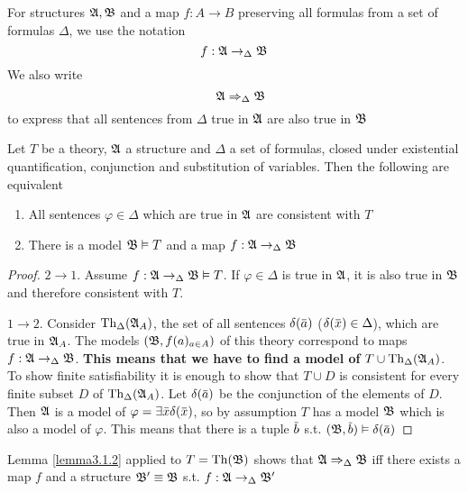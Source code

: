 \documentclass[11pt]{article}
\begin{document}
For structures \(\mathfrak{A},\mathfrak{B}\) and a map \(f:A\to B\) preserving all formulas
from a set of formulas \(\Delta\), we use the notation
\begin{equation*}
f:\mathfrak{A}\to_\Delta\mathfrak{B}
\end{equation*}
We also write
\begin{equation*}
\quad\mathfrak{A}\Rightarrow_\Delta\mathfrak{B}
\end{equation*}
to express that all sentences from \(\Delta\) true in \(\mathfrak{A}\) are also true in \(\mathfrak{B}\)

\begin{lemma}[]
\label{lemma3.1.2}
Let \(T\) be a theory, \(\mathfrak{A}\) a structure and \(\Delta\) a set of formulas, closed
under existential quantification, conjunction and substitution of variables.
Then the following are equivalent
\begin{enumerate}
\item All sentences \(\varphi\in\Delta\) which are true in \(\mathfrak{A}\) are
consistent with \(T\)
\item There is a model \(\mathfrak{B}\vDash T\) and a map \(f:\mathfrak{A}\to_\Delta\mathfrak{B}\)
\end{enumerate}
\end{lemma}

\begin{proof}
\(2\to 1\). Assume \(f:\mathfrak{A}\to_\Delta\mathfrak{B}\vDash T\). If \(\varphi\in\Delta\) is true in \(\mathfrak{A}\), it is also true in \(\mathfrak{B}\) and
therefore consistent with \(T\).

\(1\to2\). Consider \(\operatorname{Th}_\Delta(\mathfrak{A}_A)\), the set of all sentences \(\delta(\bbar{a})\)
(\(\delta(\bbar{x})\in\Delta\)), which are true in \(\mathfrak{A}_A\). The models
\((\mathfrak{B},f(a)_{a\in A})\) of this theory correspond to maps
\(f:\mathfrak{A}\to_\Delta\mathfrak{B}\). \textbf{This means that we have to find a model of}
\(T\cup\operatorname{Th}_\Delta(\mathfrak{A}_A)\). To show finite satisfiability it is enough to
show that \(T\cup D\) is consistent for every finite subset \(D\) of
\(\operatorname{Th}_\Delta(\mathfrak{A}_A)\). Let \(\delta(\bbar{a})\) be the conjunction of the elements
of \(D\). Then \(\mathfrak{A}\) is a model of \(\varphi=\exists\bar{x}\delta(\barx)\), so by assumption \(T\) has a
model \(\mathfrak{B}\) which is also a model of \(\varphi\). This means that there is a tuple \(\barb\) s.t. \((\fB,\barb)\vDash\delta(\bara)\)
\end{proof}

Lemma \ref{lemma3.1.2} applied to \(T=\operatorname{Th}(\mathfrak{B})\) shows that
\(\mathfrak{A}\Rightarrow_\Delta\mathfrak{B}\) iff there exists a map \(f\) and a structure
\(\mathfrak{B}'\equiv\mathfrak{B}\) s.t. \(f:\mathfrak{A}\to_\Delta\mathfrak{B}'\)
\end{document}
